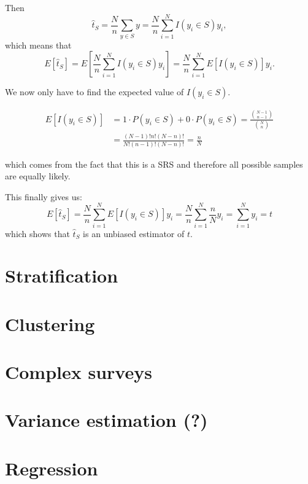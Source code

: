 \documentclass{article}
\begin{document}
Then $$ \hat{t}_S = \frac{N}{n} \sum_{y \in S} y = \frac{N}{n} \sum_{i = 1}^{N}
I(y_i \in S) y_i ,$$
which means that
$$ E \left[ \hat{t}_S \right] = E \left[ \frac{N}{n} \sum_{i = 1}^{N}
  I(y_i \in S) y_i \right] =
\frac{N}{n} \sum_{i = 1}^{N}
E\left[ I(y_i \in S) \right] y_i .$$

We now only have to find the expected value of $I(y_i \in S)$.

\begin{align}
  E \left[ I(y_i \in S) \right]
  &= 1 \cdot P(y_i \in S) + 0 \cdot P(y_i \in S)
    = \frac{\binom{N - 1}{n - 1}}{\binom{N}{n}} \\
  &= \frac{(N - 1)! n! (N - n)!}{N! (n - 1)! (N - n)!}
    = \frac{n}{N}
\end{align}

which comes from the fact that this is a SRS and therefore all possible samples
are equally likely.

This finally gives us:
$$
E \left[ \hat{t}_S \right]
= \frac{N}{n} \sum_{i = 1}^{N} E\left[ I(y_i \in S) \right] y_i
= \frac{N}{n} \sum_{i = 1}^{N} \frac{n}{N} y_i
= \sum_{i = 1}^{N} y_i
= t
$$
which shows that $\hat{t}_S$ is an unbiased estimator of $t$.


\section{Stratification}

\section{Clustering}

\section{Complex surveys}

\section{Variance estimation (?)}

\section{Regression}
\end{document}
